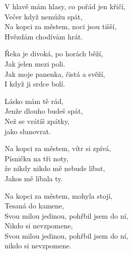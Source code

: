 
\ve{}
V hlavě mám hlasy, co pořád jen křičí,\\
Večer když nemůžu spát,\\
Na kopci za městem, noci jsou tišší,\\
Hvězdám chodívám hrát.

\ve{}
Řeka je divoká, po horách běží,\\
Jak jelen mezi poli.\\
Jak moje panenka, čistá a svěží,\\
I když ji srdce bolí.

\cho{}
Lásko mám tě rád,\\
Jenže dlouho budeš spát,\\
Než se vrátíš zpátky,\\
jako slunovrat.

\ve{}
Na kopci za městem, vítr si zpívá,\\
Písničku na tři noty,\\
že nikdy nikdo mě nebude líbat,\\
Jakos mě líbala ty.

\cho{}

\ve{}
Na kopci za městem, mohyla stojí,\\
Tesaná do kamene,\\
Svou milou jedinou, pohřbil jsem do ní,\\
Nikdo si nevzpomene,\\
Svou milou jedinou, pohřbil jsem do ní,\\
nikdo si nevzpomene.

\cho{}

\esong{}